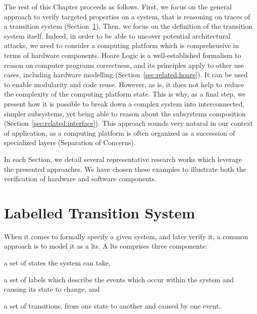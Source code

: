 The rest of this Chapter proceeds as follows.
%
First, we focus on the general approach to verify targeted properties on a
system, that is reasoning on traces of a transition system
(Section~\ref{sec:related:lts}).
%
Then, we focus on the definition of the transition system itself.
%
Indeed, in order to be able to uncover potential architectural attacks, we need
to consider a computing platform which is comprehensive in terms of hardware
components.
%
Hoare Logic is a well-established formalism to reason on computer programs
correctness, and its principles apply to other use cases, including hardware
modelling (Section~\ref{sec:related:hoare}).
%
It can be used to enable modularity and code reuse.
%
However, as is, it does not help to reduce the complexity of the computing
platform state.
%
This is why, as a final step, we present how it is possible to break down a
complex system into interconnected, simpler subsystems, yet being able to reason
about the subsystems composition (Section~\ref{sec:related:interface}).
%
This approach sounds very natural in our context of application, as a computing
platform is often organized as a succession of specialized layers (Separation of
Concerns).

In each Section, we detail several representative research works which leverage
the presented approaches.
%
We have chosen these examples to illustrate both the verification of hardware
and software components.

\section{Labelled Transition System} %
\label{sec:related:lts}

When it comes to formally specify a given system, and later verify it, a common
approach is to model it as a \ac{lts}.
%
A \ac{lts} comprises three components:
%
\begin{inparaenum}[(1)]
%
\item a set of states the system can take,
%
\item a set of labels which describe the events which occur within the system
  and causing its state to change, and
%
\item a set of transitions, from one state to another and caused by one event.
%
\end{inparaenum}

